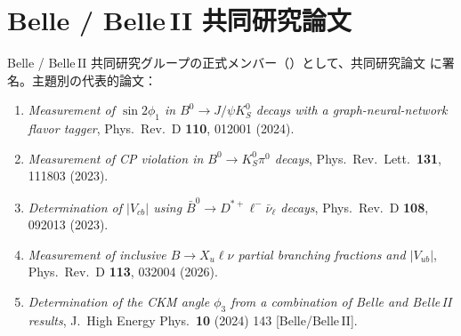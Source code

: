 \documentclass[a4paper,11pt,fontset=none]{ctexart}
\begin{document}
\section{Belle / Belle\,II 共同研究論文}

{\small Belle / Belle\,II 共同研究グループの正式メンバー（）として、共同研究論文 に署名。主題別の代表的論文：}

{\small\setlength{\emergencystretch}{3em}

\smallskip
\noindent{}
\begin{enumerate}\setlength{\itemsep}{1.5pt}
  \item \textit{Measurement of $\sin 2\phi_{1}$ in $B^{0}\!\to J/\psi K_{S}^{0}$ decays with a graph-neural-network flavor tagger}, Phys.\ Rev.\ D \textbf{110}, 012001 (2024)\;[Belle\,II].
  \item \textit{Measurement of CP violation in $B^{0}\!\to K_{S}^{0}\pi^{0}$ decays}, Phys.\ Rev.\ Lett.\ \textbf{131}, 111803 (2023)\;[Belle\,II].
  \item \textit{Determination of $|V_{cb}|$ using $\bar{B}^{0}\!\to D^{*+}\ell^{-}\bar\nu_{\ell}$ decays}, Phys.\ Rev.\ D \textbf{108}, 092013 (2023)\;[Belle\,II].
  \item \textit{Measurement of inclusive $B\!\to X_{u}\ell\nu$ partial branching fractions and $|V_{ub}|$}, Phys.\ Rev.\ D \textbf{113}, 032004 (2026)\;[Belle\,II].
  \item \textit{Determination of the CKM angle $\phi_{3}$ from a combination of Belle and Belle\,II results}, J.\ High Energy Phys.\ \textbf{10} (2024) 143 [Belle/Belle\,II].
\end{enumerate}

}
\end{document}
